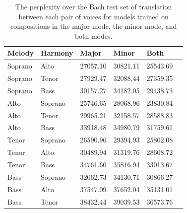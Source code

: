 \documentclass{sig-alternate}
\begin{document}
\begin{table}[h]
  \begin{center}
      \begin{tabular}{| l | l | l | l | l | l |}
      \hline
     Melody & Harmony & Major & Minor & Both \\ \hline
     Soprano & Alto & 27057.10 & 30821.11 & 25543.69 \\ \hline
     Soprano & Tenor & 27929.47 & 32088.44 & 27359.35 \\ \hline
     Soprano & Bass & 30157.27 & 34182.05 & 29438.73 \\ \hline
     Alto & Soprano & 25746.65 & 28068.96 & 23830.84 \\ \hline
     Alto & Tenor & 29965.21 & 32158.57 & 28588.83 \\ \hline
     Alto & Bass & 33918.48 & 34980.79 & 31759.61 \\ \hline
     Tenor & Soprano & 26590.96 & 29394.93 & 25802.08 \\ \hline
     Tenor & Alto & 30489.94 & 31319.76 & 28608.72 \\ \hline
     Tenor & Bass & 34761.60 & 35816.94 & 33013.67 \\ \hline
     Bass & Soprano & 32062.73 & 34130.71 & 30866.27 \\ \hline
     Bass & Alto & 37547.09 & 37652.04 & 35131.01 \\ \hline
     Bass & Tenor & 38432.44 & 39039.53 & 36573.76 \\ \hline
      \end{tabular}
  \end{center}
  \caption{The perplexity over the Bach test set of translation between each pair of voices for models trained on compositions in the major mode, the minor mode, and both modes.}
\end{table}
\end{document}
